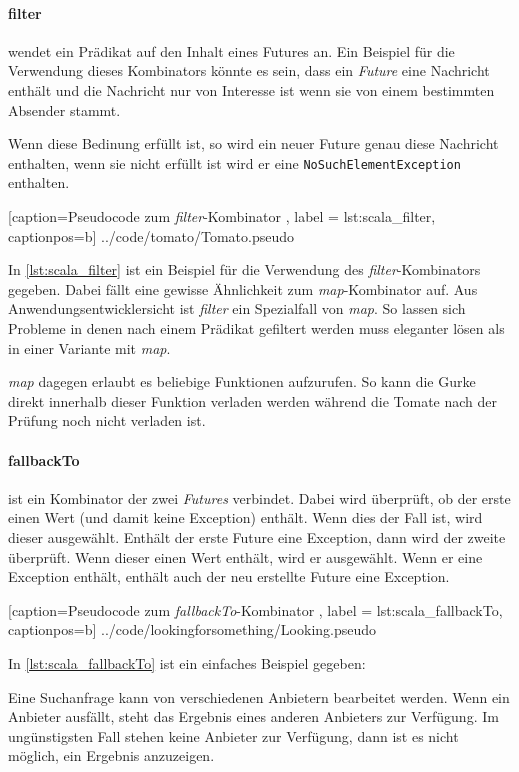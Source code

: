 \paragraph{filter} wendet ein Prädikat auf den Inhalt eines Futures
an. Ein Beispiel für die Verwendung dieses Kombinators könnte es sein,
dass ein \emph{Future} eine Nachricht enthält und die Nachricht nur
von Interesse ist wenn sie von einem bestimmten Absender stammt.

Wenn diese Bedinung erfüllt ist, so wird ein neuer Future genau
diese Nachricht enthalten, wenn sie nicht erfüllt ist wird er eine
\texttt{NoSuchElementException} enthalten.


    [caption={Pseudocode zum \emph{filter}-Kombinator },
       label = lst:scala_filter,
       captionpos=b]
 {../code/tomato/Tomato.pseudo}
 
In \ref{lst:scala_filter} ist ein Beispiel für die Verwendung des
\emph{filter}-Kombinators gegeben. Dabei fällt eine gewisse Ähnlichkeit
zum \emph{map}-Kombinator auf. Aus Anwendungsentwicklersicht ist
\emph{filter} ein Spezialfall von \emph{map}. So lassen sich Probleme
in denen nach einem Prädikat gefiltert werden muss eleganter lösen
als in einer Variante mit \emph{map}.
 
\emph{map} dagegen erlaubt es beliebige Funktionen aufzurufen.
So kann die Gurke direkt innerhalb dieser Funktion verladen werden
während die Tomate nach der Prüfung noch nicht verladen ist.
 
\paragraph{fallbackTo} ist ein Kombinator der zwei \emph{Futures}
verbindet. Dabei wird überprüft, ob der erste einen Wert (und damit
keine Exception) enthält. Wenn dies der Fall ist, wird dieser ausgewählt.
Enthält der erste Future eine Exception, dann wird der zweite überprüft.
Wenn dieser einen Wert enthält, wird er ausgewählt. Wenn er eine
Exception enthält, enthält auch der neu erstellte Future eine Exception.


    [caption={Pseudocode zum \emph{fallbackTo}-Kombinator },
       label = lst:scala_fallbackTo,
       captionpos=b]
 {../code/lookingforsomething/Looking.pseudo}
 
In \ref{lst:scala_fallbackTo} ist ein einfaches Beispiel gegeben:

Eine Suchanfrage kann von verschiedenen Anbietern bearbeitet werden. 
Wenn ein Anbieter ausfällt, steht das Ergebnis eines anderen Anbieters 
zur Verfügung. Im ungünstigsten Fall stehen keine Anbieter zur Verfügung, 
dann ist es nicht möglich, ein Ergebnis anzuzeigen.


